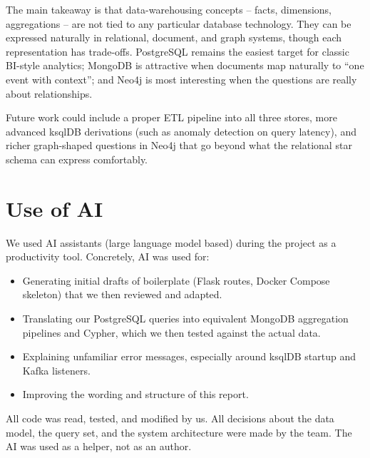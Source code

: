 \documentclass[11pt,a4paper]{article}
\begin{document}
The main takeaway is that data-warehousing concepts -- facts, dimensions,
aggregations -- are not tied to any particular database technology. They can
be expressed naturally in relational, document, and graph systems, though
each representation has trade-offs. PostgreSQL remains the easiest target
for classic BI-style analytics; MongoDB is attractive when documents map
naturally to ``one event with context''; and Neo4j is most interesting when
the questions are really about relationships.

Future work could include a proper ETL pipeline into all three stores, more
advanced ksqlDB derivations (such as anomaly detection on query latency),
and richer graph-shaped questions in Neo4j that go beyond what the
relational star schema can express comfortably.

\section{Use of AI}\label{sec:ai}

We used AI assistants (large language model based) during the project as a
productivity tool. Concretely, AI was used for:

\begin{itemize}[leftmargin=*]
    \item Generating initial drafts of boilerplate (Flask routes, Docker
          Compose skeleton) that we then reviewed and adapted.
    \item Translating our PostgreSQL queries into equivalent MongoDB
          aggregation pipelines and Cypher, which we then tested against
          the actual data.
    \item Explaining unfamiliar error messages, especially around ksqlDB
          startup and Kafka listeners.
    \item Improving the wording and structure of this report.
\end{itemize}

All code was read, tested, and modified by us. All decisions about the data
model, the query set, and the system architecture were made by the team.
The AI was used as a helper, not as an author.

\newpage
\printbibliography[title={References}]

\newpage
\appendix
\end{document}
